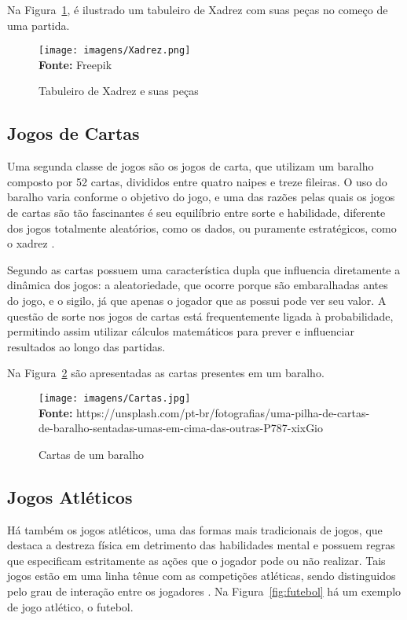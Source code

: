 Na Figura~\ref{fig:xadrez}, é ilustrado um tabuleiro de Xadrez com suas peças no começo de uma partida.


\FloatBarrier
\begin{figure}[!htbp]
	\centering
	\caption{Tabuleiro de Xadrez e suas peças}
	\texttt{[image: imagens/Xadrez.png]}
	\\\textbf{Fonte:} Freepik
	\label{fig:xadrez}
\end{figure}
\FloatBarrier

\subsection{Jogos de Cartas}

Uma segunda classe de jogos são os jogos de carta, que utilizam um baralho composto por 52 cartas, divididos entre quatro naipes e treze fileiras. O uso do baralho varia conforme o objetivo do jogo, e uma das razões pelas quais os jogos de cartas são tão fascinantes é seu equilíbrio entre sorte e habilidade, diferente dos jogos totalmente aleatórios, como os dados, ou puramente estratégicos, como o xadrez \cite{Parlett1990}.


Segundo  as cartas possuem uma característica dupla que influencia diretamente a dinâmica dos jogos: a aleatoriedade, que ocorre porque são embaralhadas antes do jogo, e o sigilo, já que apenas o jogador que as possui pode ver seu valor. A questão de sorte nos jogos de cartas está frequentemente ligada à probabilidade, permitindo assim utilizar cálculos matemáticos para prever e influenciar resultados ao longo das partidas. 

Na Figura~\ref{fig:cartas} são apresentadas as cartas presentes em um baralho.


\FloatBarrier 
\begin{figure}[!htbp]
	\centering
	\caption{Cartas de um baralho}
	\texttt{[image: imagens/Cartas.jpg]}
	\\\textbf{Fonte:} https://unsplash.com/pt-br/fotografias/uma-pilha-de-cartas-de-baralho-sentadas-umas-em-cima-das-outras-P787-xixGio
	\label{fig:cartas}
\end{figure}
\FloatBarrier


\subsection{Jogos Atléticos}


Há também os jogos atléticos, uma das formas mais tradicionais de jogos, que destaca a destreza física em detrimento das habilidades mental e possuem regras que especificam estritamente as ações que o jogador pode ou não realizar. Tais jogos estão em uma linha tênue com as competições atléticas, sendo distinguidos pelo grau de interação entre os jogadores \cite{Crawford1997}. Na Figura~\ref{fig:futebol} há um exemplo de jogo atlético, o futebol.


